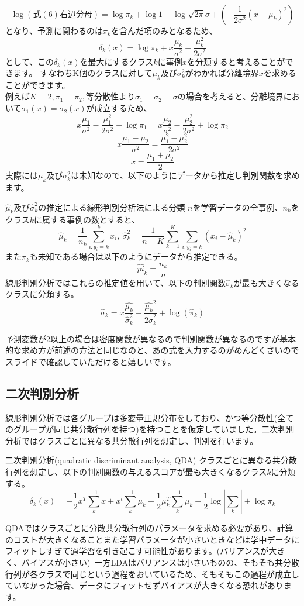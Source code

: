 \documentclass[uplatex]{jsarticle}
\begin{document}
$$\log(式(6)右辺分母) = \log{\pi_k} + \log{1} - \log{\sqrt{2\pi}\sigma} + \left(-\frac{1}{2\sigma^2}(x - \mu_k)^2 \right)$$
となり、予測に関わるのは$\pi_k$を含んだ項のみとなるため、
$$\delta_k(x) = \log{\pi_k} + x \frac{\mu_k}{\sigma^2} - \frac{\mu_k^2}{2\sigma^2}$$
として、この$\delta_k(x)$を最大にするクラス$k$に事例$x$を分類すると考えることができます。
すなわちK個のクラスに対して$\mu_k及び\sigma_k^2$がわかれば分離境界$x$を求めることができます。\\
例えば$K=2, \pi_1=\pi_2, 等分散性より\sigma_1 = \sigma_2 = \sigma$の場合を考えると、分離境界において$\sigma_1(x) = \sigma_2(x)$が成立するため、
$$x\frac{\mu_1}{\sigma^2} - \frac{\mu_1^2}{2\sigma^2} + \log{\pi_1} = x\frac{\mu_2}{\sigma^2} - \frac{\mu_2^2}{2\sigma^2} + \log{\pi_2}$$
$$x\frac{\mu_1 - \mu_2}{\sigma^2} = \frac{\mu_1^2 - \mu_2^2}{2\sigma^2}$$
$$x = \frac{\mu_1 + \mu_2}{2}$$
実際には$\mu_k及び\sigma_k^2$は未知なので、以下のようにデータから推定し判別関数を求めます。
\begin{itembox}[l]{$\hat{\mu}_k及び\hat{\sigma}_k^2$の推定による線形判別分析法による分類}
  $n$を学習データの全事例、$n_k$を クラス$k$に属する事例の数とすると、
  $$\hat{\mu}_k = \frac{1}{n_k}\sum_{i:y_i =k}^k x_i,\ \hat{\sigma}_k^2 = \frac{1}{n−K}\sum_{k=1}^K\sum_{i:y_i=k}(x_i - \hat{\mu}_k)^2$$
  また$\pi_k$も未知である場合は以下のようにデータから推定できる。
  $$\hat{pi}_k = \frac{n_k}{n}$$
  線形判別分析ではこれらの推定値を用いて、以下の判別関数$\hat{\sigma}_k$が最も大きくなるクラスに分類する。
  $$\hat{\sigma}_k = x\frac{\hat{\mu_k}}{\hat{\sigma}_k^2} - \frac{\hat{\mu_k}^2}{2\hat{\sigma}_k^2} + \log(\hat{\pi}_k)$$
\end{itembox}
予測変数が2以上の場合は密度関数が異なるので判別関数が異なるのですが基本的な求め方が前述の方法と同じなのと、あの式を入力するのがめんどくさいのでスライドで確認していただけると嬉しいです。

\subsection{二次判別分析}
線形判別分析では各グループは多変量正規分布をしており、かつ等分散性(全てのグループが同じ共分散行列を持つ)を持つことを仮定していました。二次判別分析ではクラスごとに異なる共分散行列を想定し、判別を行います。\
\begin{itembox}[l]{二次判別分析(quadratic discriminant analysis, QDA)}
  クラスごとに異なる共分散行列を想定し、以下の判別関数の与えるスコアが最も大きくなるクラス$k$に分類する。
  $$\delta_k(x) = -\frac{1}{2}x^T\sum_k^{-1}x + x^t\sum_k^{-1}\mu_k - \frac{1}{2}\mu_k^T\sum_k^{-1}\mu_k - \frac{1}{2}\log{|\sum_k|} + \log{\pi_k}$$
\end{itembox}
QDAではクラスごとに分散共分散行列のパラメータを求める必要があり、計算のコストが大きくなることまた学習パラメータが小さいときなどは学中データにフィットしすぎて過学習を引き起こす可能性があります。(バリアンスが大きく、バイアスが小さい)\
一方LDAはバリアンスは小さいものの、そもそも共分散行列が各クラスで同じという過程をおいているため、そもそもこの過程が成立していなかった場合、データにフィットせずバイアスが大きくなる恐れがあります。
\end{document}
